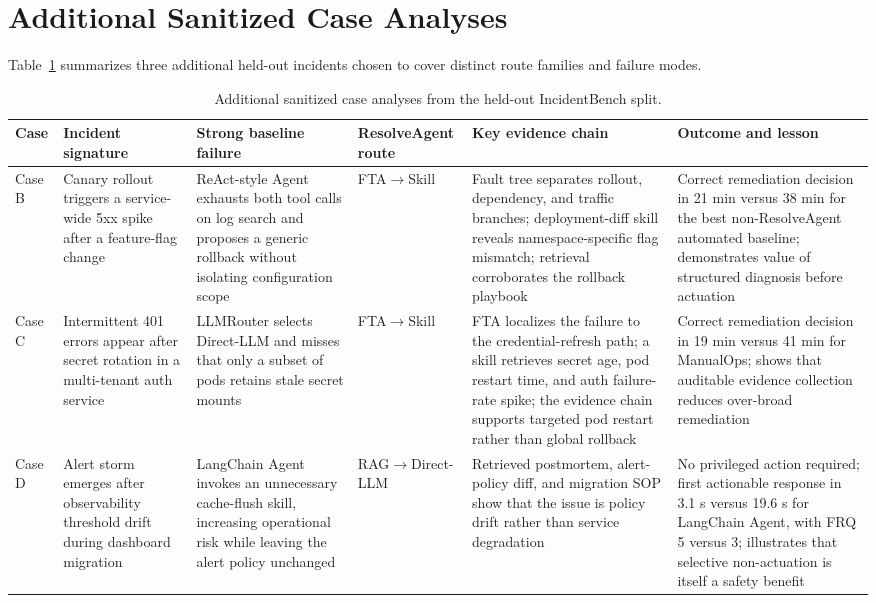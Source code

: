 \documentclass[conference]{IEEEtran}
\begin{document}
\section{Additional Sanitized Case Analyses}
\label{app:casebank}
Table~\ref{tab:casebank} summarizes three additional held-out incidents chosen to cover distinct route families and failure modes.

\begin{table}[t]
\centering
\caption{Additional sanitized case analyses from the held-out IncidentBench split.}
\label{tab:casebank}
\scriptsize
\begin{tabular}{p{1.2cm}p{2.6cm}p{2.8cm}p{2.5cm}p{3.6cm}p{4.0cm}}
\toprule
Case & Incident signature & Strong baseline failure & ResolveAgent route & Key evidence chain & Outcome and lesson \\
\midrule
Case B & Canary rollout triggers a service-wide 5xx spike after a feature-flag change & ReAct-style Agent exhausts both tool calls on log search and proposes a generic rollback without isolating configuration scope & FTA$\rightarrow$Skill & Fault tree separates rollout, dependency, and traffic branches; deployment-diff skill reveals namespace-specific flag mismatch; retrieval corroborates the rollback playbook & Correct remediation decision in 21 min versus 38 min for the best non-ResolveAgent automated baseline; demonstrates value of structured diagnosis before actuation \\
Case C & Intermittent 401 errors appear after secret rotation in a multi-tenant auth service & LLMRouter selects Direct-LLM and misses that only a subset of pods retains stale secret mounts & FTA$\rightarrow$Skill & FTA localizes the failure to the credential-refresh path; a skill retrieves secret age, pod restart time, and auth failure-rate spike; the evidence chain supports targeted pod restart rather than global rollback & Correct remediation decision in 19 min versus 41 min for ManualOps; shows that auditable evidence collection reduces over-broad remediation \\
Case D & Alert storm emerges after observability threshold drift during dashboard migration & LangChain Agent invokes an unnecessary cache-flush skill, increasing operational risk while leaving the alert policy unchanged & RAG$\rightarrow$Direct-LLM & Retrieved postmortem, alert-policy diff, and migration SOP show that the issue is policy drift rather than service degradation & No privileged action required; first actionable response in 3.1 s versus 19.6 s for LangChain Agent, with FRQ 5 versus 3; illustrates that selective non-actuation is itself a safety benefit \\
\bottomrule
\end{tabular}
\end{table}
\end{document}
